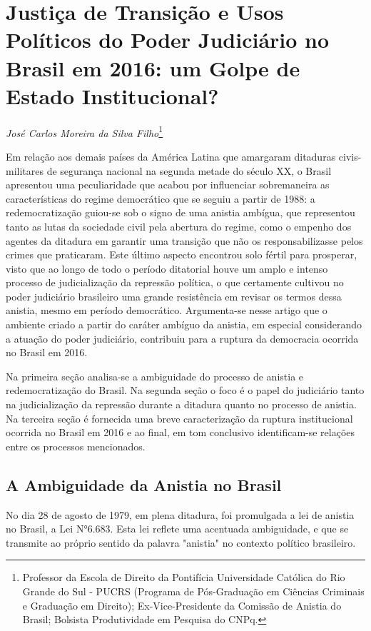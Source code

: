 \chapter{Justiça de Transição e Usos Políticos do Poder Judiciário no
Brasil em 2016: um Golpe de Estado Institucional?}

\emph{José Carlos Moreira da Silva Filho}\footnote{Professor da Escola
  de Direito da Pontifícia Universidade Católica do Rio Grande do Sul -
  PUCRS (Programa de Pós-Graduação em Ciências Criminais e Graduação em
  Direito); Ex-Vice-Presidente da Comissão de Anistia do Brasil;
  Bolsista Produtividade em Pesquisa do CNPq.}

Em relação aos demais países da América Latina que amargaram ditaduras
civis-militares de segurança nacional na segunda metade do século XX, o
Brasil apresentou uma peculiaridade que acabou por influenciar
sobremaneira as características do regime democrático que se seguiu a
partir de 1988: a redemocratização guiou-se sob o signo de uma anistia
ambígua, que representou tanto as lutas da sociedade civil pela abertura
do regime, como o empenho dos agentes da ditadura em garantir uma
transição que não os responsabilizasse pelos crimes que praticaram. Este
último aspecto encontrou solo fértil para prosperar, visto que ao longo
de todo o período ditatorial houve um amplo e intenso processo de
judicialização da repressão política, o que certamente cultivou no poder
judiciário brasileiro uma grande resistência em revisar os termos dessa
anistia, mesmo em período democrático. Argumenta-se nesse artigo que o
ambiente criado a partir do caráter ambíguo da anistia, em especial
considerando a atuação do poder judiciário, contribuiu para a ruptura da
democracia ocorrida no Brasil em 2016.

Na primeira seção analisa-se a ambiguidade do processo de anistia e
redemocratização do Brasil. Na segunda seção o foco é o papel do
judiciário tanto na judicialização da repressão durante a ditadura
quanto no processo de anistia. Na terceira seção é fornecida uma breve
caracterização da ruptura institucional ocorrida no Brasil em 2016 e ao
final, em tom conclusivo identificam-se relações entre os processos
mencionados.

\section{A Ambiguidade da Anistia no Brasil}

No dia 28 de agosto de 1979, em plena ditadura, foi promulgada a lei de
anistia no Brasil, a Lei N°6.683. Esta lei reflete uma acentuada
ambiguidade, e que se transmite ao próprio sentido da palavra "anistia"
no contexto político brasileiro.

